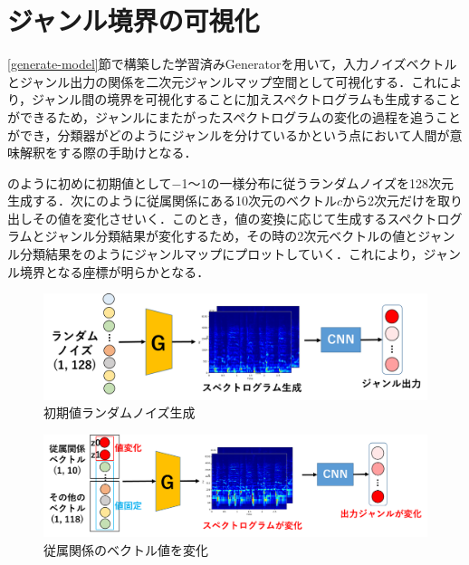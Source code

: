 \clearpage
\section{ジャンル境界の可視化}\label{visualize}
\ref{generate-model}節で構築した学習済みGeneratorを用いて，入力ノイズベクトルとジャンル出力の関係を二次元ジャンルマップ空間として可視化する．これにより，ジャンル間の境界を可視化することに加えスペクトログラムも生成することができるため，ジャンルにまたがったスペクトログラムの変化の過程を追うことができ，分類器がどのようにジャンルを分けているかという点において人間が意味解釈をする際の手助けとなる．


のように初めに初期値として$-$1～1の一様分布に従うランダムノイズを128次元生成する．次にのように従属関係にある10次元のベクトル$c$から2次元だけを取り出しその値を変化させいく．このとき，値の変換に応じて生成するスペクトログラムとジャンル分類結果が変化するため，その時の2次元ベクトルの値とジャンル分類結果をのようにジャンルマップにプロットしていく．これにより，ジャンル境界となる座標が明らかとなる．

\begin{figure}[htbp]
	\begin{center}
		\includegraphics[scale=0.5]{./images/visualize/randomnoise.png}
		\caption{初期値ランダムノイズ生成}
		\label{fig:randomnoise}
	\end{center}
\end{figure}
\begin{figure}[htbp]
	\begin{center}
		\includegraphics[scale=0.5]{./images/visualize/variablenoise.png}
		\caption{従属関係のベクトル値を変化}
		\label{fig:variablenoise}
	\end{center}
\end{figure}

